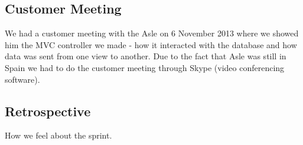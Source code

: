 \subsection{Customer Meeting}
We had a customer meeting with the Asle on 6 November 2013 where we showed him the MVC controller we made - how it interacted with the database and how data was sent from one view to another. Due to the fact that Asle was still in Spain we had to do the customer meeting through Skype (video conferencing software).

\subsection{Retrospective}
How we feel about the sprint.